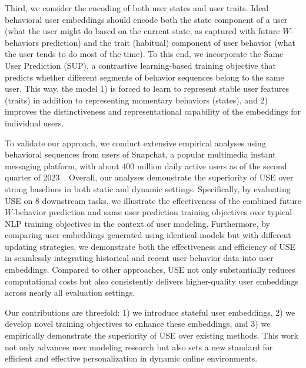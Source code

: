 \documentclass{article}
\begin{document}

Third, we consider the encoding of both user states and user traits. Ideal behavioral user embeddings should encode both the state component of a user (what the user might do based on the current state, as captured with future $W$-behaviors prediction) and the trait (habitual) component of user behavior (what the user tends to do most of the time).  To this end, we incorporate the Same User Prediction (SUP), a contrastive learning-based training objective that predicts whether different segments of behavior sequences belong to the same user. This way, the model 1) is forced to learn to represent stable user features (traits) in addition to representing momentary behaviors (states), and 2) improves the distinctiveness and representational capability of the embeddings for individual users. 

To validate our approach, we conduct extensive empirical analyses using behavioral sequences from users of Snapchat, a popular multimedia instant messaging platform, with about 400 million daily active users as of the second quarter of 2023~\citep{snapchat_2023}. Overall, our analyses demonstrate the superiority of USE over strong baselines in both static and dynamic settings. Specifically, by evaluating USE on $8$ downstream tasks, we illustrate the effectiveness of the combined future $W$-behavior prediction and same user prediction training objectives over typical NLP training objectives in the context of user modeling. 
Furthermore, by comparing user embeddings generated using identical models but with different updating strategies, we demonstrate both the effectiveness and efficiency of USE in seamlessly integrating historical and recent user behavior data into user embeddings.
Compared to other approaches, USE not only substantially reduces computational costs but also consistently delivers higher-quality user embeddings across nearly all evaluation settings.

Our contributions are threefold: 1) we introduce stateful 
 user embeddings, 2) we develop novel training objectives to enhance these embeddings, and 3) we empirically demonstrate the superiority of USE over existing methods. This work not only advances user modeling research but also sets a new standard for efficient and effective personalization in dynamic online environments.
\end{document}
